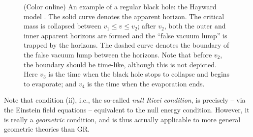 \documentclass[12pt]{article}
\newcommand{\2}{$^2$}
\newcommand{\3}{$^3$}
\newcommand{\4}{$_4$}
\newcommand{\5}{$_5$}
\begin{document}
\begin{figure}
\begin{center}
\caption{\label{fig:regular_2}(Color online) An example of a regular black hole: the Hayward model \cite{Hayward:2005gi}. The solid curve denotes the apparent horizon. The critical mass is collapsed between $v_{1} \leqslant v \leqslant v_{2}$; after $v_{2}$, both the outer and inner apparent horizons are formed and the ``false vacuum lump'' is trapped by the horizons. The  dashed curve denotes the boundary of the false vacuum lump between the  horizons. Note that before $v_{2}$, the boundary should be time-like, although this is not depicted. Here $v_{3}$ is the time when the black hole stops to collapse and begins to evaporate; and $v_{4}$ is the time when the evaporation ends.}
\end{center}
\end{figure}


Note that condition (ii), i.e., the so-called \emph{null Ricci condition}, is precisely -- via the Einstein field equations -- equivalent to the null energy condition. However, it is really a \emph{geometric} condition, and is thus actually applicable to more general geometric theories than GR. 
\end{document}
